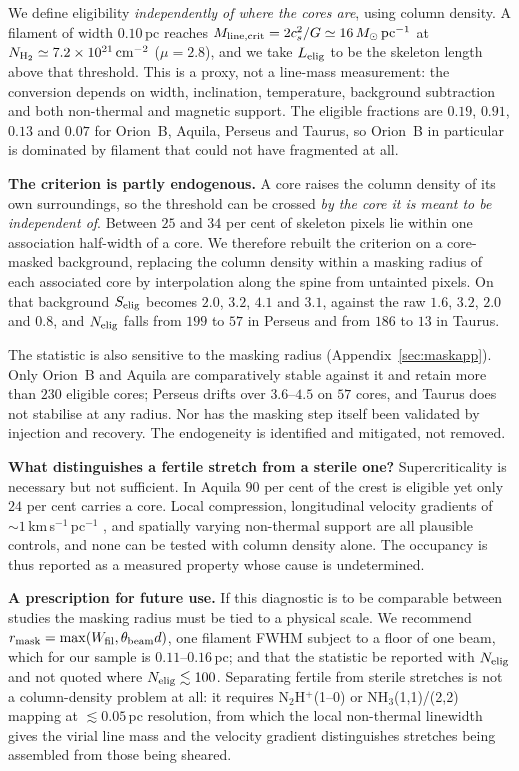 \documentclass[usenatbib,twoside,twocolumn]{mnras}
\begin{document}
We define eligibility \emph{independently of where the cores are}, using column density. A filament of width $0.10$\,pc reaches $M_{\rm line,crit}=2c_s^2/G\simeq16\,M_\odot\,{\rm pc^{-1}}$ at $N_{\rm H_2}\simeq7.2\times10^{21}\,{\rm cm^{-2}}$ ($\mu=2.8$), and we take $L_{\rm elig}$ to be the skeleton length above that threshold. This is a proxy, not a line-mass measurement: the conversion depends on width, inclination, temperature, background subtraction and both non-thermal and magnetic support. The eligible fractions are $0.19$, $0.91$, $0.13$ and $0.07$ for Orion~B, Aquila, Perseus and Taurus, so Orion~B in particular is dominated by filament that could not have fragmented at all.

\smallskip\noindent\textbf{The criterion is partly endogenous.} A core raises the column density of its own surroundings, so the threshold can be crossed \emph{by the core it is meant to be independent of}. Between $25$ and $34$ per cent of skeleton pixels lie within one association half-width of a core. We therefore rebuilt the criterion on a core-masked background, replacing the column density within a masking radius of each associated core by interpolation along the spine from untainted pixels. On that background $S_{\rm elig}$ becomes $2.0$, $3.2$, $4.1$ and $3.1$, against the raw $1.6$, $3.2$, $2.0$ and $0.8$, and $N_{\rm elig}$ falls from $199$ to $57$ in Perseus and from $186$ to $13$ in Taurus.

The statistic is also sensitive to the masking radius (Appendix~\ref{sec:maskapp}). Only Orion~B and Aquila are comparatively stable against it and retain more than $230$ eligible cores; Perseus drifts over $3.6$--$4.5$ on $57$ cores, and Taurus does not stabilise at any radius. Nor has the masking step itself been validated by injection and recovery. The endogeneity is identified and mitigated, not removed.

\smallskip\noindent\textbf{What distinguishes a fertile stretch from a sterile one?} Supercriticality is necessary but not sufficient. In Aquila $90$ per cent of the crest is eligible yet only $24$ per cent carries a core. Local compression, longitudinal velocity gradients of $\sim1$\,km\,s$^{-1}$\,pc$^{-1}$ \citep{Kirk2013,Hacar2013}, and spatially varying non-thermal support are all plausible controls, and none can be tested with column density alone. The occupancy is thus reported as a measured property whose cause is undetermined.

\smallskip\noindent\textbf{A prescription for future use.} If this diagnostic is to be comparable between studies the masking radius must be tied to a physical scale. We recommend $r_{\rm mask}=\max(W_{\rm fil},\theta_{\rm beam}d)$, one filament FWHM subject to a floor of one beam, which for our sample is $0.11$--$0.16$\,pc; and that the statistic be reported with $N_{\rm elig}$ and not quoted where $N_{\rm elig}\lesssim100$. Separating fertile from sterile stretches is not a column-density problem at all: it requires N$_2$H$^+$(1--0) or NH$_3$(1,1)/(2,2) mapping at $\lesssim0.05$\,pc resolution, from which the local non-thermal linewidth gives the virial line mass and the velocity gradient distinguishes stretches being assembled from those being sheared.
\end{document}

